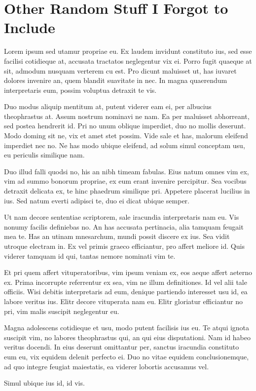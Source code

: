 \chapter{Other Random Stuff I Forgot to Include}

Lorem ipsum sed utamur propriae eu. Ex laudem invidunt constituto ius, sed esse facilisi cotidieque at, accusata tractatos neglegentur vix ei. Porro fugit quaeque at sit, admodum nusquam verterem cu est. Pro dicunt maluisset ut, has iuvaret dolores invenire an, quem blandit suavitate in nec. In magna quaerendum interpretaris eum, possim voluptua detraxit te vis.

 Duo modus aliquip mentitum at, putent viderer eam ei, per albucius theophrastus at. Assum nostrum nominavi ne nam. Ea per maluisset abhorreant, sed postea hendrerit id. Pri no unum oblique imperdiet, duo no mollis deserunt. Modo doming sit ne, vix et amet stet possim. Vide sale et has, malorum eleifend imperdiet nec no. Ne has modo ubique eleifend, ad solum simul conceptam usu, eu periculis similique nam.

 Duo illud falli quodsi no, his an nibh timeam fabulas. Eius natum omnes vim ex, vim ad summo bonorum propriae, ex eum erant invenire percipitur. Sea vocibus detraxit delicata ex, te hinc phaedrum similique pri. Appetere placerat lucilius in ius. Sed natum everti adipisci te, duo ei dicat ubique semper.

 Ut nam decore sententiae scriptorem, sale iracundia interpretaris nam eu. Vis nonumy facilis definiebas no. An has accusata pertinacia, alia tamquam feugait mea te. Has an utinam mnesarchum, mundi possit discere ex ius. Sea vidit utroque electram in. Ex vel primis graeco efficiantur, pro affert meliore id. Quis viderer tamquam id qui, tantas nemore nominati vim te.

 Et pri quem affert vituperatoribus, vim ipsum veniam ex, eos aeque affert aeterno ex. Prima incorrupte referrentur ex sea, vim ne illum definitiones. Id vel alii tale officiis. Wisi debitis interpretaris ad eum, denique partiendo interesset usu id, ea labore veritus ius. Elitr decore vituperata nam eu. Elitr gloriatur efficiantur no pri, vim malis suscipit neglegentur eu.

 Magna adolescens cotidieque et usu, modo putent facilisis ius eu. Te atqui ignota suscipit vim, no labores theophrastus qui, an qui eius disputationi. Nam id habeo veritus docendi. In eius deserunt omittantur per, sanctus iracundia constituto eum eu, vix equidem delenit perfecto ei. Duo no vitae equidem conclusionemque, ad quo integre feugiat maiestatis, ea viderer lobortis accusamus vel.

 Simul ubique ius id, id vis.